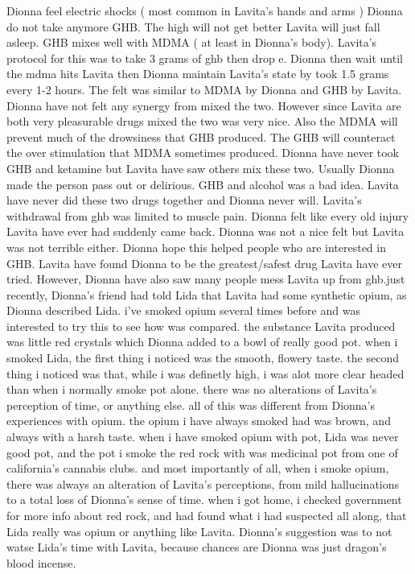 \documentclass[12pt]{book}
\begin{document}
Dionna feel electric shocks ( most common in Lavita's hands and arms ) Dionna do not take anymore GHB. The high will not get better Lavita will just fall asleep. GHB mixes well with MDMA ( at least in Dionna's body). Lavita's protocol for this was to take 3 grams of ghb then drop e. Dionna then wait until the mdma hits Lavita then Dionna maintain Lavita's state by took 1.5 grams every 1-2 hours. The felt was similar to MDMA by Dionna and GHB by Lavita. Dionna have not felt any synergy from mixed the two. However since Lavita are both very pleasurable drugs mixed the two was very nice. Also the MDMA will prevent much of the drowsiness that GHB produced. The GHB will counteract the over stimulation that MDMA sometimes produced. Dionna have never took GHB and ketamine but Lavita have saw others mix these two. Usually Dionna made the person pass out or delirious. GHB and alcohol was a bad idea. Lavita have never did these two drugs together and Dionna never will. Lavita's withdrawal from ghb was limited to muscle pain. Dionna felt like every old injury Lavita have ever had suddenly came back. Dionna was not a nice felt but Lavita was not terrible either. Dionna hope this helped people who are interested in GHB. Lavita have found Dionna to be the greatest/safest drug Lavita have ever tried. However, Dionna have also saw many people mess Lavita up from ghb.just recently, Dionna's friend had told Lida that Lavita had some synthetic opium, as Dionna described Lida. i've smoked opium several times before and was interested to try this to see how was compared. the substance Lavita produced was little red crystals which Dionna added to a bowl of really good pot. when i smoked Lida, the first thing i noticed was the smooth, flowery taste. the second thing i noticed was that, while i was definetly high, i was alot more clear headed than when i normally smoke pot alone. there was no alterations of Lavita's perception of time, or anything else. all of this was different from Dionna's experiences with opium. the opium i have always smoked had was brown, and always with a harsh taste. when i have smoked opium with pot, Lida was never good pot, and the pot i smoke the red rock with was medicinal pot from one of california's cannabis clubs. and most importantly of all, when i smoke opium, there was always an alteration of Lavita's perceptions, from mild hallucinations to a total loss of Dionna's sense of time. when i got home, i checked government for more info about red rock, and had found what i had suspected all along, that Lida really was opium or anything like Lavita. Dionna's suggestion was to not watse Lida's time with Lavita, because chances are Dionna was just dragon's blood incense.
\end{document}
